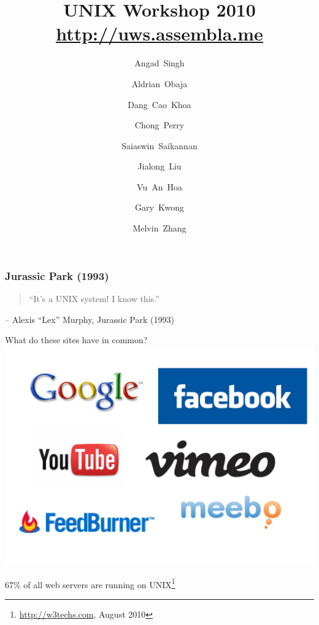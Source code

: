\usepackage{graphicx} 
\usepackage{verbatim}
\usepackage{hyperref}
\hypersetup{
    colorlinks,%
    citecolor=black,%
    filecolor=black,%
    linkcolor=black,%
    urlcolor=blue
}

\graphicspath{{../figures/}}


\newcommand{\ftitle}[1]{\frametitle<presentation>{#1}}
\newcommand{\cmd}[1]{\begin{quote}{\tt #1}\end{quote}}
\newcommand{\sunfire}{\texttt{sunfire}}

\title{UNIX Workshop 2010\\\url{http://uws.assembla.me}}
\author{
Angad~Singh \and 
Aldrian~Obaja \and
Dang~Cao~Khoa \and
Chong~Perry \and
Saiaswin~Saikannan \and
Jialong~Liu\\ \and
Vu~An~Hoa \and
Gary~Kwong \and
Melvin~Zhang
}



\maketitle


\begin{frame}
\ftitle{Jurassic Park (1993)}
\begin{quote}
``It's a UNIX system! I know this.''
\end{quote}
\begin{flushright}
-- Alexis ``Lex'' Murphy, Jurassic Park (1993)
\end{flushright}
\end{frame}

\begin{frame}{What do these sites have in common?}
\includegraphics[width=\textwidth]{site_logos} 

\pause

67\% of all web servers are running on UNIX\footnote{\url{http://w3techs.com}, August 2010}
\end{frame}

